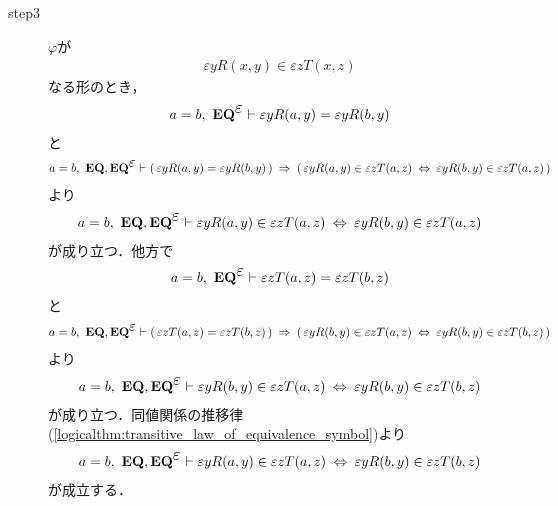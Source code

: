 \begin{sketch}
\begin{description}
			\item[step3]
				$\varphi$が
				\begin{align}
					\varepsilon y R(x,y) \in \varepsilon z T(x,z)
				\end{align}
				なる形のとき，
				\begin{align}
					a = b,\ \EQAXEP \vdash 
					\varepsilon y R(a,y) = \varepsilon y R(b,y)
				\end{align}
				と
				\begin{align}
					a = b,\ \EQAX, \EQAXEP \vdash 
					(\, \varepsilon y R(a,y) = \varepsilon y R(b,y)\, )
					\rarrow (\, \varepsilon y R(a,y) \in \varepsilon z T(a,z)
					\lrarrow \varepsilon y R(b,y) \in \varepsilon z T(a,z)\, )
				\end{align}
				より
				\begin{align}
					a = b,\ \EQAX, \EQAXEP \vdash 
					\varepsilon y R(a,y) \in \varepsilon z T(a,z)
					\lrarrow \varepsilon y R(b,y) \in \varepsilon z T(a,z)
				\end{align}
				が成り立つ．他方で
				\begin{align}
					a = b,\ \EQAXEP \vdash 
					\varepsilon z T(a,z) = \varepsilon z T(b,z)
				\end{align}
				と
				\begin{align}
					a = b,\ \EQAX, \EQAXEP \vdash 
					(\, \varepsilon z T(a,z) = \varepsilon z T(b,z)\, )
					\rarrow (\, \varepsilon y R(b,y) \in \varepsilon z T(a,z)
					\lrarrow \varepsilon y R(b,y) \in \varepsilon z T(b,z)\, )
				\end{align}
				より
				\begin{align}
					a = b,\ \EQAX, \EQAXEP \vdash 
					\varepsilon y R(b,y) \in \varepsilon z T(a,z)
					\lrarrow \varepsilon y R(b,y) \in \varepsilon z T(b,z)
				\end{align}
				が成り立つ．同値関係の推移律
				(\ref{logicalthm:transitive_law_of_equivalence_symbol})より
				\begin{align}
					a = b,\ \EQAX, \EQAXEP \vdash 
					\varepsilon y R(a,y) \in \varepsilon z T(a,z)
					\lrarrow \varepsilon y R(b,y) \in \varepsilon z T(b,z)
				\end{align}
				が成立する．
		\end{description}
	\end{sketch}